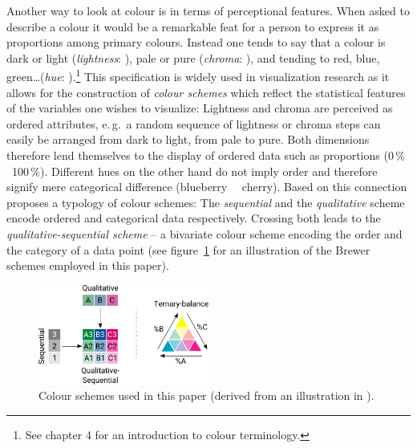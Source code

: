 \documentclass[parskip=half]{scrartcl}
\begin{document}
Another way to look at colour is in terms of perceptional features. When asked to describe a colour it would be a remarkable feat for a person to express it as proportions among primary colours. Instead one tends to say that a colour is dark or light (\emph{lightness}:   ), pale or pure (\emph{chroma}:   ), and tending to red, blue, green\ldots (\emph{hue}:   ).\footnote{
  See \cite{Fairchild2005} chapter 4 for an introduction to colour terminology.
}
This specification is widely used in visualization research as it allows for the construction of \emph{colour schemes} which reflect the statistical features of the variables one wishes to visualize: Lightness and chroma are perceived as ordered attributes, e.\,g.~a random sequence of lightness or chroma steps can easily be arranged from dark to light, from pale to pure. Both dimensions therefore lend themselves to the display of ordered data such as proportions (0\,\%~  ~100\,\%). Different hues on the other hand do not imply order and therefore signify mere categorical difference (blueberry~ ~cherry). Based on this connection \textcite{Brewer1994} proposes a typology of colour schemes: The \emph{sequential} and the \emph{qualitative} scheme encode ordered and categorical data respectively. Crossing both leads to the \emph{qualitative-sequential scheme} -- a bivariate colour scheme encoding the order and the category of a data point (see figure~\ref{fig:brewer} for an illustration of the Brewer schemes employed in this paper).

\begin{figure}[!htb]
  \centering
  \includegraphics[width = 0.5\textwidth]{./fig/brewer_subset.pdf}
  \caption{Colour schemes used in this paper (derived from an illustration in \cite{Brewer1994}).}
  \label{fig:brewer}
\end{figure}

\clearpage
\end{document}
